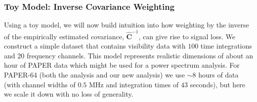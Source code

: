 \documentclass[preprint2,numberedappendix,tighten]{aastex6}  %
\begin{document}
\subsubsection{Toy Model: Inverse Covariance Weighting}
\label{sec:toymodel}

%

Using a toy model, we will now build intuition into how weighting by the inverse of the empirically estimated covariance, $\widehat{\textbf{C}}^{-1}$, can give rise to signal loss.  We construct a simple dataset that contains visibility data with $100$ time integrations and $20$ frequency channels. This model represents realistic dimensions of about an hour of PAPER data which might be used for a power spectrum analysis. For PAPER-64 (both the  analysis and our new analysis) we use $\sim8$ hours of data (with channel widths of $0.5$ MHz and integration times of $43$ seconds), but here we scale it down with no loss of generality. 
\end{document}
